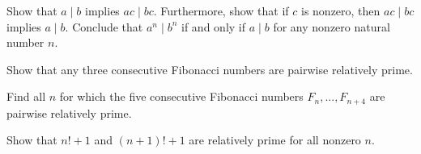 \begin{routine}
  \exercise Show that $a\mid b$ implies $ac\mid bc$. Furthermore, show that if $c$ is nonzero, then $ac\mid bc$ implies $a\mid b$. Conclude that $a^n\mid b^n$ if and only if $a\mid b$ for any nonzero natural number $n$.
  \exercise
  \begin{subexenum}
  \item Show that any three consecutive Fibonacci numbers are pairwise relatively prime.
  \item Find all $n$ for which the five consecutive Fibonacci numbers $F_n,...,F_{n+4}$ are pairwise relatively prime.
  \end{subexenum}
  \exercise Show that $n!+1$ and $(n+1)!+1$ are relatively prime for all nonzero $n$.
\end{routine}

